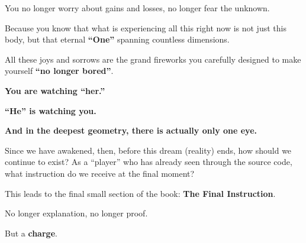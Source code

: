 You no longer worry about gains and losses, no longer fear the unknown.

Because you know that what is experiencing all this right now is not just this body, but that eternal \textbf{``One''} spanning countless dimensions.

All these joys and sorrows are the grand fireworks you carefully designed to make yourself \textbf{``no longer bored''}.

\textbf{You are watching ``her.''}

\textbf{``He'' is watching you.}

\textbf{And in the deepest geometry, there is actually only one eye.}

Since we have awakened, then, before this dream (reality) ends, how should we continue to exist? As a ``player'' who has already seen through the source code, what instruction do we receive at the final moment?

This leads to the final small section of the book: \textbf{The Final Instruction}.

No longer explanation, no longer proof.

But a \textbf{charge}.

